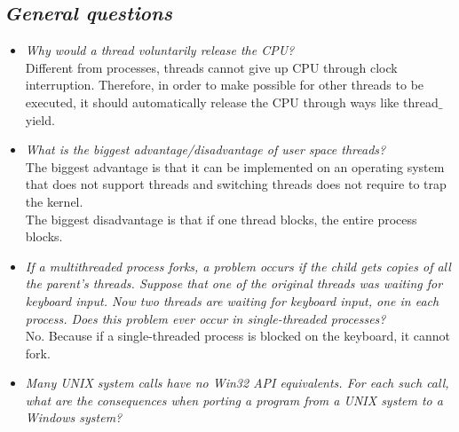 \documentclass{article}
\begin{document}
\begin{spacing}{2.0}
\section{\textit{General questions}}
\begin{itemize}
	\item \textit{Why would a thread voluntarily release the CPU?}\\
	Different from processes, threads cannot give up CPU through clock interruption. Therefore, in order to make possible for other threads to be executed, it should automatically release the CPU through ways like thread$\_$yield.
	\item \textit{What is the biggest advantage/disadvantage of user space threads?}\\
	The biggest advantage is that it can be implemented on an operating system that does not support threads and switching threads does not require to trap the kernel.\\
	The biggest disadvantage is that if one thread blocks, the entire process blocks. 

	\item \textit{If a multithreaded process forks, a problem occurs if the child gets copies of all the parent’s threads. Suppose that one of the original threads was waiting for keyboard input. Now two threads are waiting for keyboard input, one in each process. Does this problem ever occur in single-threaded processes?}\\
	No. Because if a single-threaded process is blocked on the keyboard, it cannot fork. 
	\item \textit{Many UNIX system calls have no Win32 API equivalents. For each such call, what are the consequences when porting a program from a UNIX system to a Windows system?}\\
	
\end{itemize}

\end{spacing}
\end{document}
